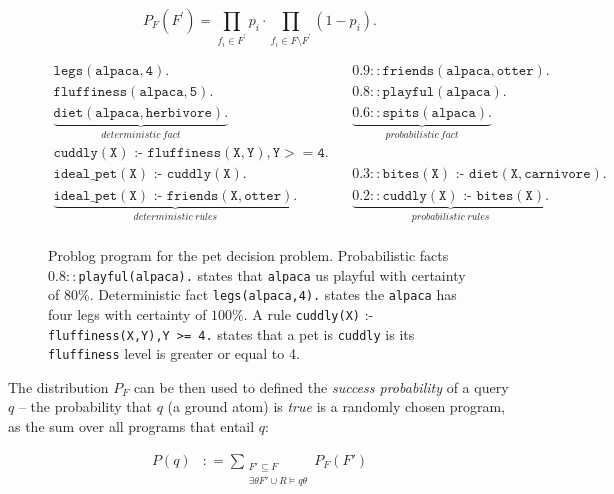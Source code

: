 \begin{equation}
	P_F(F^{\prime}) = \prod_{f_i \in F^{\prime}}p_i \cdot \prod_{f_i\in F\setminus F^{\prime}}(1 - p_i).
\end{equation}


\begin{figure}
	$$\begin{aligned}
		{\mathtt {legs(alpaca,4)}}. ~~~~&0.9{:: }{\mathtt {friends(alpaca,otter)}}. \nonumber \\
		{\mathtt {fluffiness(alpaca,5)}}. ~~~~&0.8{:: }{\mathtt {playful(alpaca)}}. \nonumber \\
		\underbrace{{\mathtt {diet(alpaca,herbivore)}}.}_{deterministic ~ fact} ~~~~&\underbrace{0.6{:: }{\mathtt {spits(alpaca)}}.}_{probabilistic ~ fact} \nonumber \\
		\mathtt {cuddly(X)}\text{ :- }{\mathtt {fluffiness(X,Y),Y >= 4}}. ~~~~&  \nonumber \\
		\mathtt {ideal\_pet(X)} \text{ :- }{\mathtt {cuddly(X)}}. ~~~~& 0.3{:: }{\mathtt {bites(X)}} \text{ :- }{\mathtt {diet(X,carnivore)}}. \nonumber \\
		\underbrace{\mathtt {ideal\_pet(X)}\text{ :- }{\mathtt {friends(X,otter)}}.}_{deterministic ~ rules} ~~~~& \underbrace{0.2{:: }{\mathtt {cuddly(X)}} \text{ :- }{\mathtt {bites(X)}}.}_{probabilistic ~ rules} \nonumber \\
	\end{aligned}$$
	\caption[Example Problog program]{Problog program for the pet decision problem. Probabilistic facts  $0.8::$\texttt {playful(alpaca).} states that \texttt{alpaca} us playful with certainty of $80 \%$. Deterministic fact \texttt{legs(alpaca,4).} states the \texttt{alpaca} has four legs with certainty of $100 \%$.  A rule \texttt{cuddly(X)} :- \texttt{fluffiness(X,Y),Y >= 4.} states that a pet is \texttt{cuddly} is its \texttt{fluffiness} level is greater or equal to 4. \label{fig:problog}}
\end{figure}


The distribution $P_F$ can be then used to defined the \textit{success probability} of a query $q$ -- the probability that $q$ (a ground atom) is \textit{true} is a randomly chosen program, as the sum over all programs that entail $q$:

$$
\begin{aligned}
	P(q)&{:}{=}\sum \limits _{\begin{array}{c} F'\subseteq F \\ \exists \theta F'\cup R\models q\theta \end{array}} P_F(F')
\end{aligned}
$$

